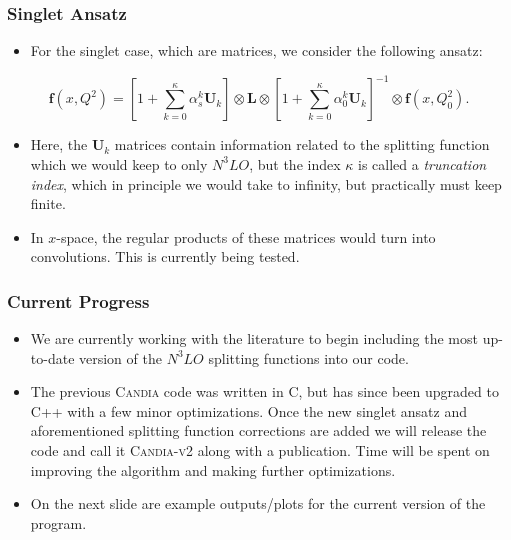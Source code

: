 \documentclass{beamer}
\newcommand{\vv}[1]{\mathbf{\bm{#1}}}
\begin{document}
\begin{frame}
  \frametitle{Singlet Ansatz}

  \begin{itemize}
  \item For the singlet case, which are matrices, we consider the following ansatz:
  \end{itemize}

  \begin{equation}
    \vv{f}(x, Q^2) = \left[ 1 + \sum_{k=0}^{\kappa} \alpha_s^k \vv{U}_k \right] \otimes \vv{L} \otimes \left[ 1 + \sum_{k=0}^{\kappa} \alpha_0^k \vv{U}_k \right]^{-1} \otimes \vv{f}(x, Q_0^2).
  \end{equation}

  \begin{itemize}
  \item Here, the $\vv{U}_k$ matrices contain information related to the splitting function which we would keep to only $N^3LO$, but the index $\kappa$ is called a \textit{truncation index}, which in principle we would take to infinity, but practically must keep finite.
  \item In $x$-space, the regular products of these matrices would turn into convolutions. This is currently being tested.
  \end{itemize}
\end{frame}


\begin{frame}
  \frametitle{Current Progress}

  \begin{itemize}
  \item We are currently working with the literature to begin including the most up-to-date version of the $N^3LO$ splitting functions into our code.
  \item The previous \textsc{Candia} code was written in C, but has since been upgraded to C++ with a few minor optimizations. Once the new singlet ansatz and aforementioned splitting function corrections are added we will release the code and call it \textsc{Candia-v2} along with a publication. Time will be spent on improving the algorithm and making further optimizations.
  \item On the next slide are example outputs/plots for the current version of the program.
  \end{itemize}
\end{frame}
\end{document}
